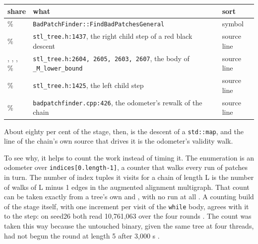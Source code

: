 \begin{table}[t]
\centering
\small
\begin{tabularx}{\textwidth}{XXX}
\toprule
share & what & sort \\
\midrule
\ProfileShareFindBadPatches{} \% & \texttt{BadPatchFinder:\allowbreak{}:\allowbreak{}FindBadPatchesGeneral} & symbol \\
\ProfileShareRightChild{} \% & \texttt{stl\_\allowbreak{}\allowbreak{}tree.\allowbreak{}h:\allowbreak{}1437}, the right child step of a red black descent & source line \\
\ProfileShareLowerBoundOne{}, \ProfileShareLowerBoundTwo{}, \ProfileShareLowerBoundThree{}, \ProfileShareLowerBoundFour{} \% & \texttt{stl\_\allowbreak{}\allowbreak{}tree.\allowbreak{}h:\allowbreak{}2604,\allowbreak{} 2605,\allowbreak{} 2603,\allowbreak{} 2607}, the body of \texttt{\_\allowbreak{}\allowbreak{}M\_\allowbreak{}\allowbreak{}lower\_\allowbreak{}\allowbreak{}bound} & source line \\
\ProfileShareLeftChild{} \% & \texttt{stl\_\allowbreak{}\allowbreak{}tree.\allowbreak{}h:\allowbreak{}1425}, the left child step & source line \\
\ProfileShareOdometerWalk{} \% & \texttt{badpatchfinder.\allowbreak{}cpp:\allowbreak{}426}, the odometer's rewalk of the chain & source line \\
\bottomrule
\end{tabularx}
\end{table}

About eighty per cent of the stage, then, is the descent of a \texttt{std:\allowbreak{}:\allowbreak{}map}, and the line of the chain's own source that drives it is the odometer's validity walk.

To see why, it helps to count the work instead of timing it. The enumeration is an odometer over \texttt{indices[0.\allowbreak{}length-\allowbreak{}1]}, a counter that walks every run of patches in turn. The number of index tuples it visits for a chain of length L is the number of walks of L minus 1 edges in the augmented alignment multigraph. That count can be taken exactly from a tree's own \protect{} and \protect{}, with no run at all {}. A counting build of the stage itself, with one increment per visit of the \texttt{while} body, agrees with it to the step: on seed26 both read 10,761,063 over the four rounds {}. The count was taken this way because the untouched binary, given the same tree at four threads, had not begun the round at length 5 after 3,000 s {}.

